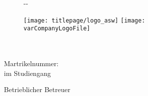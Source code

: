 \makeatletter
\begin{titlepage}
    \begin{figure}[t]
        \begin{adjustwidth}{-\oddsidemargin-1in}{-\rightmargin}
            
            \minipage{0pt}
              \noindent
            \endminipage
            
            \vspace*{10mm}
            \minipage{0.1\paperwidth}
              \hfill
            \endminipage
            \minipage{0.25\paperwidth}
              \vspace{\varTitlepageLogoMarginTop}
              \texttt{[image: titlepage/logo\_asw]}
            \endminipage
            \minipage{0.3\paperwidth}
                \hfill
            \endminipage
            \minipage{0.25\paperwidth}
                \ifdefined\varCompanyLogoFile
                  \vspace{\varTitlepageLogoMarginTop}
                  \texttt{[image: \\varCompanyLogoFile]}
                \else
                  \hfill
                \fi
            \endminipage

        \end{adjustwidth}
    \end{figure}

    \vspace*{2cm}

    \begin{flushleft}
        \Huge
        \textbf{\@title}\\[2cm]

        \LARGE
        \strong{\@author}\\[0.5cm]

        \large
        Martrikelnummer: \varMartrikelnummer \\[0.5cm]

        \Large
        \varArbeit{} im Studiengang\\
        \varStudiengang
    \end{flushleft}

    \vspace{0.5cm}

    \begin{flushright}
        Betrieblicher Betreuer\\
        \varBetrBetreuer\\[0.5cm]


\end{flushright}
\end{titlepage}
